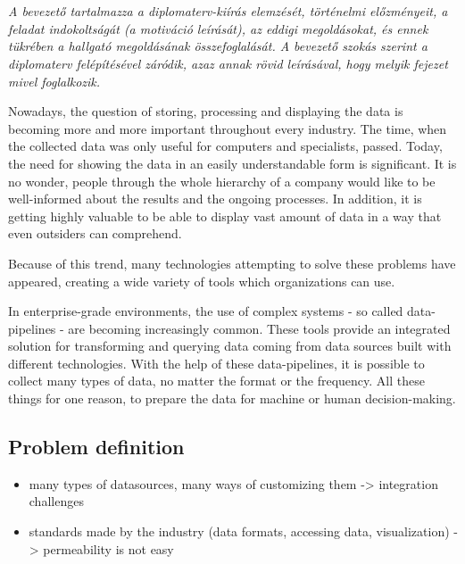 \chapter{\bevezetes}

\textit{A bevezető tartalmazza a diplomaterv-kiírás elemzését, történelmi előzményeit, a feladat indokoltságát (a motiváció leírását), az eddigi megoldásokat, és ennek tükrében a hallgató megoldásának összefoglalását.
A bevezető szokás szerint a diplomaterv felépítésével záródik, azaz annak rövid leírásával, hogy melyik fejezet mivel foglalkozik.}


Nowadays, the question of storing, processing and displaying the data is becoming more and more important throughout every industry. The time, when the collected data was only useful for computers and specialists, passed. Today, the need for showing the data in an easily understandable form is significant. It is no wonder, people through the whole hierarchy of a company would like to be well-informed about the results and the ongoing processes. In addition, it is getting highly valuable to be able to display vast amount of data in a way that even outsiders can comprehend.

Because of this trend, many technologies attempting to solve these problems have
appeared, creating a wide variety of tools which organizations can use.

In enterprise-grade environments, the use of complex systems - so called data-pipelines - are becoming increasingly common. These tools provide an integrated solution for transforming and querying data coming from data sources built with different technologies. With the help of these data-pipelines, it is possible to collect many types of data, no matter the format or the frequency. All these things for one reason, to prepare the data for machine or human decision-making.

\section{Problem definition}

\begin{itemize}
	\item many types of datasources, many ways of customizing them -> integration challenges
	\item standards made by the industry (data formats, accessing data, visualization) -> permeability is not easy
\end{itemize}



